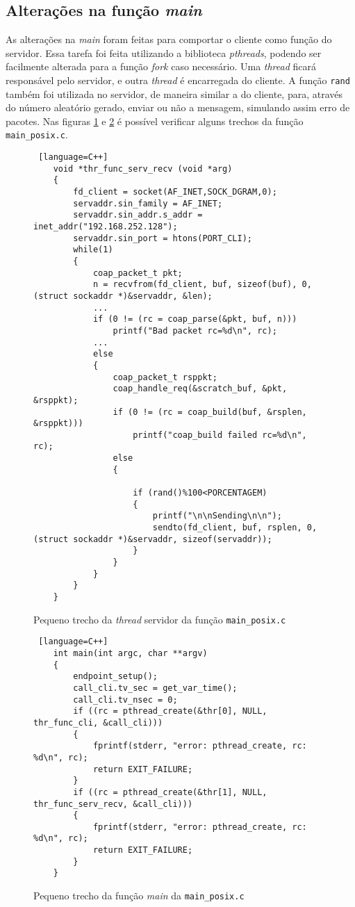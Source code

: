 \subsection{Alterações na função \textit{main}}

As alterações na \textit{main} foram feitas para comportar o cliente como função do servidor. Essa tarefa foi feita utilizando a biblioteca \textit{pthreads}, podendo ser facilmente alterada para a função \textit{fork} caso necessário. Uma \textit{thread} ficará responsável pelo servidor, e outra \textit{thread} é encarregada do cliente. A função \texttt{rand} também foi utilizada no servidor, de maneira similar a do cliente, para, através do número aleatório gerado, enviar ou não a mensagem, simulando assim erro de pacotes. Nas figuras \ref{code:thread_serv_main_posix.c} e \ref{code:main_main_posic.c} é possível verificar alguns trechos da função \texttt{main\_posix.c}.

\begin{figure}[!htb]
	\begin{lstlisting} [language=C++]
	void *thr_func_serv_recv (void *arg)
	{
		fd_client = socket(AF_INET,SOCK_DGRAM,0);
		servaddr.sin_family = AF_INET;
		servaddr.sin_addr.s_addr = inet_addr("192.168.252.128");
		servaddr.sin_port = htons(PORT_CLI);
		while(1)
		{
			coap_packet_t pkt;
			n = recvfrom(fd_client, buf, sizeof(buf), 0, (struct sockaddr *)&servaddr, &len);
			...
			if (0 != (rc = coap_parse(&pkt, buf, n)))
				printf("Bad packet rc=%d\n", rc);
			...
			else
			{			
				coap_packet_t rsppkt;
				coap_handle_req(&scratch_buf, &pkt, &rsppkt);
				if (0 != (rc = coap_build(buf, &rsplen, &rsppkt)))
					printf("coap_build failed rc=%d\n", rc);
				else
				{
					
					if (rand()%100<PORCENTAGEM)
					{
						printf("\n\nSending\n\n");
						sendto(fd_client, buf, rsplen, 0, (struct sockaddr *)&servaddr, sizeof(servaddr));
					}
				}
			}
		}
	}
	\end{lstlisting}
	\caption{Pequeno trecho da \textit{thread} servidor da função \texttt{main\_posix.c}}
	\label{code:thread_serv_main_posix.c}
\end{figure}


\begin{figure}[!htb]
	\begin{lstlisting} [language=C++]
	int main(int argc, char **argv)
	{
		endpoint_setup();
		call_cli.tv_sec = get_var_time();
		call_cli.tv_nsec = 0;
		if ((rc = pthread_create(&thr[0], NULL, thr_func_cli, &call_cli)))
		{
			fprintf(stderr, "error: pthread_create, rc: %d\n", rc);
			return EXIT_FAILURE;
		}
		if ((rc = pthread_create(&thr[1], NULL, thr_func_serv_recv, &call_cli)))
		{
			fprintf(stderr, "error: pthread_create, rc: %d\n", rc);
			return EXIT_FAILURE;
		}
	}
	\end{lstlisting}
	\caption{Pequeno trecho da função \textit{main} da \texttt{main\_posix.c}}
	\label{code:main_main_posic.c}
\end{figure}

